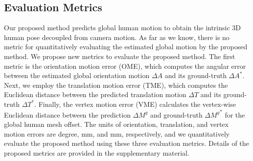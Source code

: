 \documentclass[10pt,twocolumn,letterpaper]{article}
\begin{document}


\subsection{Evaluation Metrics}


Our proposed method predicts global human motion to obtain the intrinsic 3D human pose decoupled from camera motion. As far as we know, there is no metric for quantitatively evaluating the estimated global motion by the proposed method. We propose new metrics to evaluate the proposed method. The first metric is the orientation motion error (OME), which computes the angular error between the estimated global orientation motion $\Delta{A}$ and its ground-truth $\Delta{A}^{*}$. Next, we employ the translation motion error (TME), which computes the Euclidean distance between the predicted translation motion $\Delta{T}$ and its ground-truth $\Delta{T}^{*}$. Finally, the vertex motion error (VME) calculates the vertex-wise Euclidean distance between the prediction $\Delta{M}^{g}$ and ground-truth ${\Delta{M}^{g}}^{*}$ for the global human mesh offset. The units of orientation, translation, and vertex motion errors are degree, mm, and mm, respectively, and we quantitatively evaluate the proposed method using these three evaluation metrics. Details of the proposed metrics are provided in the supplementary material.
\end{document}
